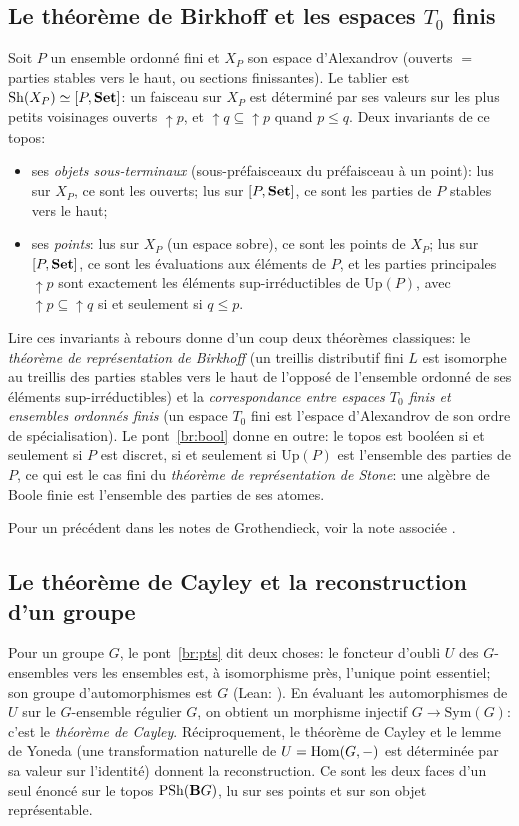 \subsection{Le théorème de Birkhoff et les espaces $T_0$ finis}

Soit $P$ un ensemble ordonné fini et $X_P$ son espace d'Alexandrov (ouverts $=$ parties stables vers le haut, ou sections finissantes). Le tablier est $\mathrm{Sh}(X_P)\simeq[P,\mathbf{Set}]$: un faisceau sur $X_P$ est déterminé par ses valeurs sur les plus petits voisinages ouverts $\uparrow p$, et $\uparrow q\subseteq\uparrow p$ quand $p\le q$. Deux invariants de ce topos:
\begin{itemize}
\item ses \emph{objets sous-terminaux} (sous-préfaisceaux du préfaisceau à un point): lus sur $X_P$, ce sont les ouverts; lus sur $[P,\mathbf{Set}]$, ce sont les parties de $P$ stables vers le haut;
\item ses \emph{points}: lus sur $X_P$ (un espace sobre), ce sont les points de $X_P$; lus sur $[P,\mathbf{Set}]$, ce sont les évaluations aux éléments de $P$, et les parties principales $\uparrow p$ sont exactement les éléments sup-irréductibles de $\mathrm{Up}(P)$, avec $\uparrow p\subseteq\uparrow q$ si et seulement si $q\le p$.
\end{itemize}
Lire ces invariants à rebours donne d'un coup deux théorèmes classiques: le \emph{théorème de représentation de Birkhoff} (un treillis distributif fini $L$ est isomorphe au treillis des parties stables vers le haut de l'opposé de l'ensemble ordonné de ses éléments sup-irréductibles) et la \emph{correspondance entre espaces $T_0$ finis et ensembles ordonnés finis} (un espace $T_0$ fini est l'espace d'Alexandrov de son ordre de spécialisation). Le pont~\ref{br:bool} donne en outre: le topos est booléen si et seulement si $P$ est discret, si et seulement si $\mathrm{Up}(P)$ est l'ensemble des parties de $P$, ce qui est le cas fini du \emph{théorème de représentation de Stone}: une algèbre de Boole finie est l'ensemble des parties de ses atomes.

Pour un précédent dans les notes de Grothendieck, voir la note associée \cite{bridges-notes}.

\subsection{Le théorème de Cayley et la reconstruction d'un groupe}

Pour un groupe $G$, le pont~\ref{br:pts} dit deux choses: le foncteur d'oubli $U$ des $G$-ensembles vers les ensembles est, à isomorphisme près, l'unique point essentiel; son groupe d'automorphismes est $G$ (Lean: ). En évaluant les automorphismes de $U$ sur le $G$-ensemble régulier $G$, on obtient un morphisme injectif $G\to\mathrm{Sym}(G)$: c'est le \emph{théorème de Cayley}. Réciproquement, le théorème de Cayley et le lemme de Yoneda (une transformation naturelle de $U = \operatorname{Hom}(G,-)$ est déterminée par sa valeur sur l'identité) donnent la reconstruction. Ce sont les deux faces d'un seul énoncé sur le topos $\mathrm{PSh}(\mathbf{B} G)$, lu sur ses points et sur son objet représentable.

